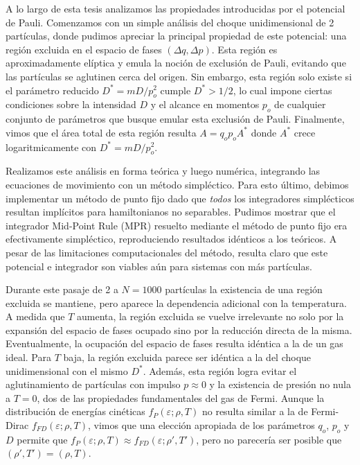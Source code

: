 A lo largo de esta tesis analizamos las propiedades introducidas por el potencial de Pauli.
Comenzamos con un simple análisis del choque unidimensional de 2 partículas, donde pudimos apreciar la principal propiedad de este potencial: una región excluida en el espacio de fases $(\Delta q, \Delta p)$.
Esta región es aproximadamente elíptica y emula la noción de exclusión de Pauli, evitando que las partículas se aglutinen cerca del origen.
Sin embargo, esta región solo existe si el parámetro reducido $D^*=mD/p_o^2$ cumple $D^*>1/2$, lo cual impone ciertas condiciones sobre la intensidad $D$ y el alcance en momentos $p_o$ de cualquier conjunto de parámetros que busque emular esta exclusión de Pauli.
Finalmente, vimos que el área total de esta región resulta $A=q_op_oA^*$ donde $A^*$ crece logaritmicamente con $D^*=mD/p_o^2$.

Realizamos este análisis en forma teórica y luego numérica, integrando las ecuaciones de movimiento con un método simpléctico.
Para esto último, debimos implementar un método de punto fijo dado que \textit{todos} los integradores simplécticos resultan implícitos para hamiltonianos no separables.
Pudimos mostrar que el integrador Mid-Point Rule (MPR) resuelto mediante el método de punto fijo era efectivamente simpléctico, reproduciendo resultados idénticos a los teóricos.
A pesar de las limitaciones computacionales del método, resulta claro que este potencial e integrador son viables aún para sistemas con más partículas.

Durante este pasaje de 2 a $N=1000$ partículas la existencia de una región excluida se mantiene, pero aparece la dependencia adicional con la temperatura.
A medida que $T$ aumenta, la región excluida se vuelve irrelevante no solo por la expansión del espacio de fases ocupado sino por la reducción directa de la misma. 
Eventualmente, la ocupación del espacio de fases resulta idéntica a la de un gas ideal.
Para $T$ baja, la región excluida parece ser idéntica a la del choque unidimensional con el mismo $D^*$.
Además, esta región logra evitar el aglutinamiento de partículas con impulso $p\approx0$ y la existencia de presión no nula a $T=0$, dos de las propiedades fundamentales del gas de Fermi.
Aunque la distribución de energías cinéticas $f_P(\varepsilon;\rho,T)$ no resulta similar a la de Fermi-Dirac $f_{FD}(\varepsilon;\rho,T)$, vimos que una elección apropiada de los parámetros $q_o$, $p_o$ y $D$ permite que $f_P(\varepsilon;\rho,T)\approx f_{FD}(\varepsilon;\rho',T')$, pero no parecería ser posible que $(\rho',T') = (\rho, T)$.

